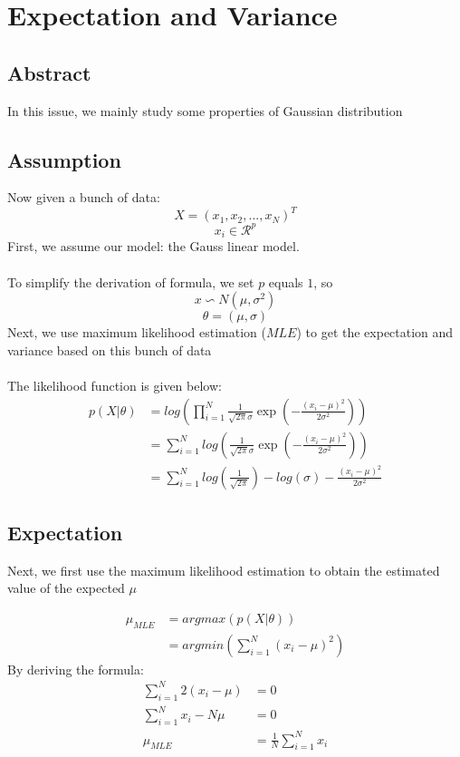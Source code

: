 \documentclass{report}
\begin{document}
\chapter{Expectation and Variance}
\section{Abstract}
In this issue, we mainly study some properties of Gaussian distribution
\section{Assumption}
Now given a bunch of data:
$$
X=(x_1, x_2, ..., x_N)^T
$$
$$
x_i \in \mathcal{R}^p
$$
First, we assume our model: the Gauss linear model.\\\\
To simplify the derivation of formula, we set $p$ equals $1$, so
$$
x \backsim N(\mu, \sigma^2)
$$
$$
\theta=(\mu, \sigma)
$$ 
Next, we use maximum likelihood estimation ($MLE $) to get the expectation and variance based on this bunch of data\\\\
The likelihood function is given below:
$$
\begin{aligned}
p(X|\theta)&=log(\prod_{i=1}^N \frac{1}{\sqrt{2\pi}\sigma} \exp(-\frac{(x_i-\mu)^2}{2\sigma^2})) \\
&=\sum_{i=1}^N log(\frac{1}{\sqrt{2\pi}\sigma} \exp(-\frac{(x_i-\mu)^2}{2\sigma^2}))\\
&=\sum_{i=1}^N log(\frac{1}{\sqrt{2\pi}}) - log(\sigma) - \frac{(x_i-\mu)^2}{2\sigma^2}
\end{aligned}
$$
\section{Expectation}
Next, we first use the maximum likelihood estimation to obtain the estimated value of the expected $\mu $

$$
\begin{aligned}
\mu_{MLE}
&=argmax(p(X|\theta))\\
&=argmin(\sum_{i=1}^N (x_i-\mu)^2)
\end{aligned}
$$
By deriving the formula:
$$
\begin{aligned}
\sum_{i=1}^N 2(x_i-\mu)&=0\\
\sum_{i=1}^N x_i - N \mu&=0\\
\mu_{MLE}&=\frac{1}{N} \sum_{i=1}^N x_i\\
\end{aligned}
$$
\end{document}
